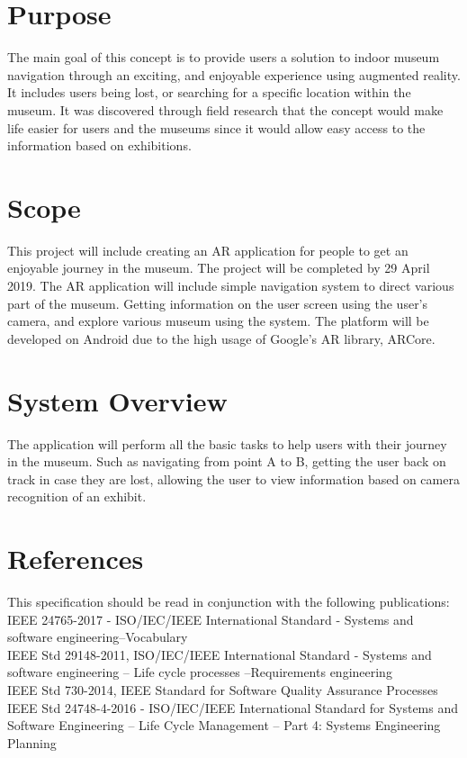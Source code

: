 {
\section{Purpose}
The main goal of this concept is to provide users a solution to indoor museum navigation through an exciting, and enjoyable experience using augmented reality. It includes users being lost, or searching for a specific location within the museum. It was discovered through field research that the concept would make life easier for users and the museums since it would allow easy access to the information based on exhibitions.

\section{Scope}
This project will include creating an AR application for people to get an enjoyable journey in the museum. The project will be completed by 29 April 2019. The AR application will include simple navigation system to direct various part of the museum. Getting information on the user screen using the user's camera, and explore various museum using the system. The platform will be developed on Android due to the high usage of Google's AR library, ARCore.

\section{System Overview}
The application will perform all the basic tasks to help users with their journey in the museum. Such as navigating from point A to B, getting the user back on track in case they are lost, allowing the user to view information based on camera recognition of an exhibit.

\section{References}
This specification should be read in conjunction with the following publications:\\
IEEE 24765-2017 - ISO/IEC/IEEE International Standard - Systems and software engineering--Vocabulary \cite{IEEE24765}\\
IEEE Std 29148-2011, ISO/IEC/IEEE International Standard - Systems and software engineering -- Life cycle processes --Requirements engineering \cite{IEEE29148} \\
IEEE Std 730-2014, IEEE Standard for Software Quality Assurance Processes \cite{IEEE730} \\
IEEE Std 24748-4-2016 - ISO/IEC/IEEE International Standard for Systems and Software Engineering -- Life Cycle Management -- Part 4: Systems Engineering Planning \cite{IEEE24748}

}
